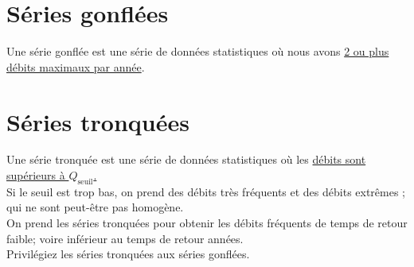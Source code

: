 \section{Séries gonflées}
Une série gonflée est une série de données statistiques où nous avons \underline{2 ou plus débits maximaux par année}.

\section{Séries tronquées}
Une série tronquée est une série de données statistiques où les \underline{débits sont supérieurs à $Q_\text{seuil}$.} \\
\Warning Si le seuil est trop bas, on prend des débits très fréquents et des débits extrêmes ; qui ne sont peut-être pas homogène. \\
On prend les séries tronquées pour obtenir les débits fréquents de temps de retour faible; voire inférieur au temps de retour années. \\
Privilégiez les séries tronquées aux séries gonflées.